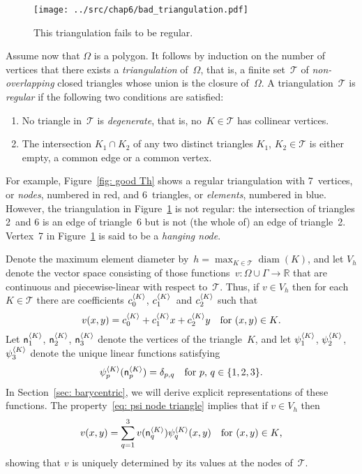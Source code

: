 \begin{figure}
\caption{This triangulation fails to be regular.}\label{fig: bad Th}
\begin{center}
\texttt{[image: ../src/chap6/bad\_triangulation.pdf]} 
\end{center}
\end{figure}

Assume now that $\Omega$ is a polygon.  It follows by induction on the number 
of vertices that there exists a \emph{triangulation} of~$\Omega$, that is, a 
finite set~$\mathcal{T}$ of \emph{non-overlapping} closed triangles whose 
union is the closure of~$\Omega$. A triangulation~$\mathcal{T}$ is 
\emph{regular} if the following two conditions are satisfied:
\begin{enumerate}
\item No triangle in~$\mathcal{T}$ is \emph{degenerate}, that is, 
no~$K\in\mathcal{T}$ has collinear vertices.
\item The intersection $K_1\cap K_2$ of any two distinct triangles $K_1$, 
$K_2\in\mathcal{T}$ is either empty, a common edge or a common vertex.
\end{enumerate}
For example, Figure~\ref{fig: good Th} shows a regular triangulation with 
7~vertices, or \emph{nodes}, numbered in red, and 6~triangles, or 
\emph{elements}, numbered in blue.  However, the triangulation in 
Figure~\ref{fig: bad Th} is not regular: the intersection of triangles 2~and 6 
is an edge of triangle~6 but is not (the whole of) an edge of triangle~2.
Vertex~7 in Figure~\ref{fig: bad Th} is said to be a \emph{hanging node}.

Denote the maximum element diameter 
by~$h=\max_{K\in\mathcal{T}}\operatorname{diam}(K)$, and let $V_h$ denote the 
vector space consisting of those functions~$v:\Omega\cup\Gamma\to\mathbb{R}$ 
that are continuous and piecewise-linear with respect to~$\mathcal{T}$.  Thus,
if $v\in V_h$ then for each~$K\in\mathcal{T}$ there are coefficients 
$c^{\langle K\rangle}_0$, $c^{\langle K\rangle}_1$~and $c^{\langle K\rangle}_2$ such that
\begin{equation}\label{eq: v K 1 x y}
v(x,y)=c^{\langle K\rangle}_0+c^{\langle K\rangle}_1x+c^{\langle K\rangle}_2y
	\quad\text{for $(x,y)\in K$.}
\end{equation}
Let $\mathsf{n}^{\langle K\rangle}_1$, $\mathsf{n}^{\langle K\rangle}_2$, $\mathsf{n}^{\langle K\rangle}_3$ 
denote the vertices of the triangle~$K$, and let $\psi^{\langle K\rangle}_1$, 
$\psi^{\langle K\rangle}_2$, $\psi^{\langle K\rangle}_3$ denote the unique linear functions 
satisfying
\begin{equation}\label{eq: psi node triangle}
\psi^{\langle K\rangle}_p(\mathsf{n}^{\langle K\rangle}_p)=\delta_{p,q}
	\quad\text{for $p$, $q\in\{1,2,3\}$.}
\end{equation}
In Section~\ref{sec: barycentric}, we will derive explicit representations of 
these functions.  The property~\eqref{eq: psi node triangle} implies that if 
$v\in V_h$ then
\[
v(x,y)=\sum_{q=1}^3v(\mathsf{n}^{\langle K\rangle}_q)\psi^{\langle K\rangle}_q(x,y)
	\quad\text{for $(x,y)\in K$,}
\]
showing that $v$ is uniquely determined by its values at the nodes 
of~$\mathcal{T}$.

